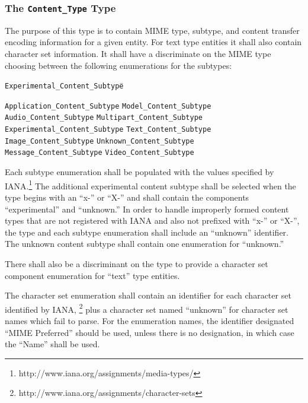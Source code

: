 \documentclass[11pt]{article}
\begin{document}
\subsubsection{The \texttt{Content\_Type} Type}
\label{sr:content-types}

The purpose of this type is to contain MIME type, subtype, and content
transfer encoding information for a given entity. For text type
entities it shall also contain character set information. It shall
have a discriminate on the MIME type choosing between the following
enumerations for the subtypes:

\begin{tabbing}
\texttt{Experimental\_Content\_Subtype}\hspace{.5in}\= \kill

\texttt{Application\_Content\_Subtype}\>
\texttt{Model\_Content\_Subtype}\\
\texttt{Audio\_Content\_Subtype}\>
\texttt{Multipart\_Content\_Subtype}\\
\texttt{Experimental\_Content\_Subtype}\>
\texttt{Text\_Content\_Subtype}\\
\texttt{Image\_Content\_Subtype}\>
\texttt{Unknown\_Content\_Subtype}\\
\texttt{Message\_Content\_Subtype}\>
\texttt{Video\_Content\_Subtype}\\
\end{tabbing}

Each subtype enumeration shall be populated with the values specified
by IANA.\footnote{http://www.iana.org/assignments/media-types/} The
additional experimental content subtype shall be selected when the
type begins with an ``x-'' or ``X-'' and shall contain the components
``experimental'' and ``unknown.'' In order to handle improperly formed
content types that are not registered with IANA and also not prefixed
with ``x-'' or ``X-'', the type and each subtype enumeration shall
include an ``unknown'' identifier. The unknown content subtype shall
contain one enumeration for ``unknown.''

There shall also be a discriminant on the type to provide a character
set component enumeration for ``text'' type entities.

The character set enumeration shall contain an identifier for each
character set identified by IANA,%
\footnote{http://www.iana.org/assignments/character-sets} plus a
character set named ``unknown'' for character set names which fail to
parse. For the enumeration names, the identifier designated ``MIME
Preferred'' should be used, unless there is no designation, in which
case the ``Name'' shall be used. 
\end{document}
